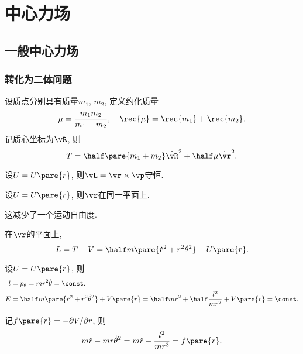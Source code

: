 \documentclass[../TheoreticalMechanics.tex]{subfiles}
\begin{document}
\section{中心力场} %
\label{sec:中心力场}

\subsection{一般中心力场} %
\label{sub:一般中心力场}

\subsubsection{转化为二体问题} %
\label{ssub:转化为二体问题}

\begin{finale}
	\begin{lemma}[约化质量]
		设质点分别具有质量$m_1$, $m_2$, 定义约化质量
		\[ \mu = \frac{m_1 m_2}{m_1 + m_2},\quad \rec{\mu} = \rec{m_1} + \rec{m_2}. \]
		记质心坐标为$\vR$, 则
		\[ T = \half\pare{m_1 + m_2}\dot{\vR}^2 + \half\mu\dot{\vr}^2. \]
	\end{lemma}
\end{finale}
\begin{theorem}[中心力场的角动量守恒]
	设$U=U\pare{r}$, 则$\vL = \vr\times\vp$守恒.
\end{theorem}
\begin{corollary}[中心力场为平面运动]
	设$U=U\pare{r}$, 则$\vr$在同一平面上.
\end{corollary}
\begin{remark}
	这减少了一个运动自由度.
\end{remark}
\begin{lemma}[极坐标下的Lagrange量]
	在$\vr$的平面上,
	\[ L = T-V = \half m\pare{\dot{r}^2 + r^2\dot{\theta}^2} - U\pare{r}. \]
\end{lemma}
\begin{finale}
	\begin{theorem}[中心力场的守恒量]
		设$U=U\pare{r}$, 则
		\begin{align*}
			l &= p_\theta = mr^2\dot{\theta} = \const. \\
			E &= \half m\pare{\dot{r}^2 + r^2\dot{\theta}^2} + V\pare{r} = \half m\dot{r}^2 + \half\frac{l^2}{mr^2} + V\pare{r} = \const.
		\end{align*}
	\end{theorem}
\end{finale}
\begin{theorem}[径向方程]
	记$f\pare{r} = -\partial V/\partial r$, 则
	\begin{equation}
		\label{eq:径向微分方程}
		m\ddot{r} - mr\dot{\theta}^2 = m\ddot{r} - \frac{l^2}{mr^3} = f\pare{r}.
	\end{equation}
\end{theorem}
\end{document}
